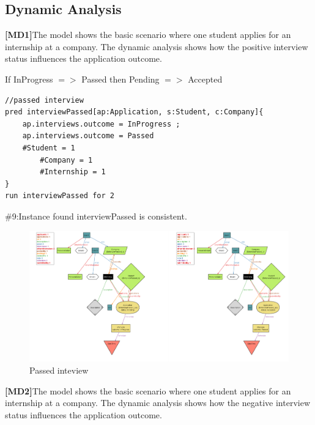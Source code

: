 \pagebreak
\subsection{Dynamic Analysis}
\textbf{[MD1]}The model shows the basic scenario where one student applies for an internship
at a company. The dynamic analysis shows how the positive interview status influences the application outcome.

If InProgress $=>$ Passed then Pending $=>$ Accepted
\begin{lstlisting}
//passed interview
pred interviewPassed[ap:Application, s:Student, c:Company]{
	ap.interviews.outcome = InProgress ; 
	ap.interviews.outcome = Passed
	#Student = 1
    	#Company = 1
    	#Internship = 1
}
run interviewPassed for 2  
\end{lstlisting}
{ \#9:Instance found interviewPassed is consistent.}
\begin{figure}[H]
    \centering
    \includegraphics[width=1\linewidth]{RASD//Images/passed.png}
    \caption{Passed inteview}
    \label{fig:enter-label}
\end{figure}

\pagebreak
\textbf{[MD2]}The model shows the basic scenario where one student applies for an internship
at a company. The dynamic analysis shows how the negative interview status influences the application outcome.

